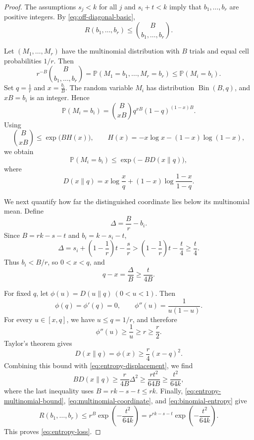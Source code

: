 \documentclass[twoside,12pt]{article}
\theoremstyle{definition}
\theoremstyle{remark}
\newcommand{\Pp}{\mathbb P}
\newcommand{\1}{\mathbf 1}
\newcommand{\KL}{D}
\begin{document}
\begin{proof}
The assumptions $s_j<k$ for all $j$ and $s_i+t<k$ imply that
$b_1,\ldots,b_r$ are positive integers. By
\eqref{eq:off-diagonal-basic},
\begin{equation}\label{eq:entropy-multinomial-bound}
 R(b_1,\ldots,b_r)
 \le\binom{B}{b_1,\ldots,b_r}.
\end{equation}

Let $(M_1,\ldots,M_r)$ have the multinomial distribution with $B$ trials and
equal cell probabilities $1/r$. Then
\begin{equation}\label{eq:multinomial-coordinate}
 r^{-B}\binom{B}{b_1,\ldots,b_r}
 =\Pp(M_1=b_1,\ldots,M_r=b_r)
 \le\Pp(M_i=b_i).
\end{equation}
Set
$
 q=\frac1r$ and
$ x=\frac{b_i}{B}$.
The random variable $M_i$ has distribution $\operatorname{Bin}(B,q)$, and
$xB=b_i$ is an integer. Hence
\[
 \Pp(M_i=b_i)
 =\binom{B}{xB}q^{xB}(1-q)^{(1-x)B}.
\]
Using
\[
 \binom{B}{xB}\le\exp\bigl(BH(x)\bigr),
 \qquad
 H(x)=-x\log x-(1-x)\log(1-x),
\]
we obtain
\begin{equation}\label{eq:binomial-entropy}
 \Pp(M_i=b_i)\le\exp\bigl(-B\KL(x\|q)\bigr),
\end{equation}
where
\[
 \KL(x\|q)
 =x\log\frac{x}{q}+(1-x)\log\frac{1-x}{1-q}.
\]

We next quantify how far the distinguished coordinate lies below its
multinomial mean. Define
\[
 \Delta=\frac Br-b_i.
\]
Since $B=rk-s-t$ and $b_i=k-s_i-t$,
\[
 \Delta
 =s_i+\left(1-\frac1r\right)t-\frac sr
 >\left(1-\frac1r\right)t-\frac t4
 \ge\frac t4.
\]
Thus $b_i<B/r$, so $0<x<q$, and
\begin{equation}\label{eq:entropy-displacement}
 q-x=\frac{\Delta}{B}\ge\frac{t}{4B}.
\end{equation}

For fixed $q$, let
$
 \phi(u)=\KL(u\|q)
 ~(0<u<1).
$
Then
\[
 \phi(q)=\phi'(q)=0,
 \qquad
 \phi''(u)=\frac1{u(1-u)}.
\]
For every $u\in[x,q]$, we have $u\le q=1/r$, and therefore
\[
 \phi''(u)\ge\frac1u\ge r\ge\frac r2.
\]
Taylor's theorem gives
\[
 \KL(x\|q)=\phi(x)\ge\frac r4(x-q)^2.
\]
Combining this bound with \eqref{eq:entropy-displacement}, we find
\[
 B\KL(x\|q)
 \ge\frac r{4B}\Delta^2
 \ge\frac{rt^2}{64B}
 \ge\frac{t^2}{64k},
\]
where the last inequality uses $B=rk-s-t\le rk$. Finally,
\eqref{eq:entropy-multinomial-bound},
\eqref{eq:multinomial-coordinate}, and \eqref{eq:binomial-entropy} give
\[
 R(b_1,\ldots,b_r)
 \le r^B\exp\!\left(-\frac{t^2}{64k}\right)
 =r^{rk-s-t}\exp\!\left(-\frac{t^2}{64k}\right).
\]
This proves \eqref{eq:entropy-loss}.
\end{proof}
\end{document}
